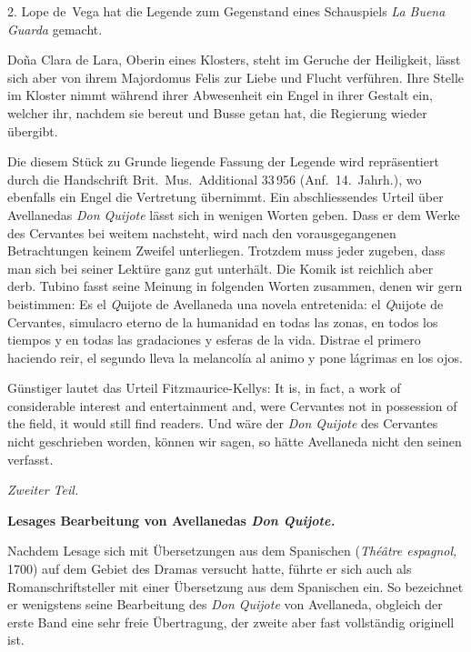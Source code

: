 2. Lope de~Vega hat die Legende zum Gegenstand eines Schauspiels
{\it\spanish La Buena Guarda} gemacht.

Doña Clara de Lara, Oberin eines Klosters, steht im Geruche der
Heiligkeit, lässt sich aber von ihrem Majordomus Felis zur Liebe und
Flucht verführen. Ihre Stelle im Kloster nimmt während ihrer Abwesenheit
ein Engel in ihrer Gestalt ein, welcher ihr, nachdem sie bereut und
Busse getan hat, die Regierung wieder übergibt.

Die diesem Stück zu Grunde liegende Fassung der Legende wird
repräsentiert durch die Handschrift Brit.\ Mus.\ Additional 33\,956
(Anf.\ 14.~Jahrh.), wo ebenfalls ein Engel die Vertretung übernimmt.
Ein abschliessendes Urteil über Avellanedas {\it Don Quijote} lässt sich
in wenigen Worten geben. Dass er dem Werke des Cervantes bei
weitem nachsteht, wird nach den vorausgegangenen Betrachtungen keinem
Zweifel unterliegen. Trotzdem muss jeder zugeben, dass man sich bei
seiner Lektüre ganz gut unterhält. Die Komik ist reichlich aber derb.
Tubino fasst seine Meinung in folgenden Worten zusammen, denen wir
gern beistimmen: {\itquoted\spanish Es el {\emph Quijote} de Avellaneda una novela
entretenida: el {\emph Quijote} de Cervantes, simulacro eterno de la humanidad
en todas las zonas, en todos los tiempos y en todas las gradaciones y
esferas de la vida. Distrae el primero haciendo reir, el segundo lleva
la melancolía al animo y pone lágrimas en los ojos.}

Günstiger lautet das Urteil Fitzmaurice-Kellys: {\itquoted\english It is, in fact, a work
of considerable interest and entertainment and, were Cervantes not in
possession of the field, it would still find readers.} Und wäre der
{\it Don Quijote} des Cervantes nicht geschrieben worden, können wir sagen, so
hätte Avellaneda nicht den seinen verfasst.

\centerline{\emph{Zweiter Teil.}}

{\bf Lesages Bearbeitung von Avellanedas {\it Don Quijote.}}

Nachdem Lesage sich mit Übersetzungen aus dem Spanischen
({\it Théâtre espagnol,} 1700) auf dem Gebiet des Dramas versucht hatte,
führte er sich auch als Romanschriftsteller mit einer Übersetzung aus
dem Spanischen ein. So bezeichnet er wenigstens seine Bearbeitung
des {\it Don Quijote} von Avellaneda, obgleich der erste Band eine sehr
freie Übertragung, der zweite aber fast vollständig originell ist.

